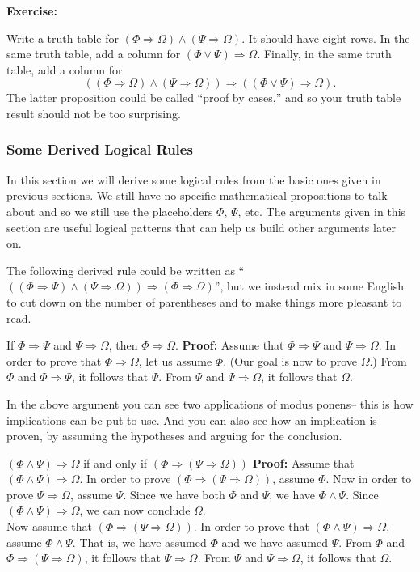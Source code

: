 \documentclass[12pt]{article}
\newcommand{\AND}{\wedge}
\newcommand{\OR}{\vee}
\newcommand{\ARR}{\Rightarrow}
\newcommand{\ex}[1]{\textbf{Exercise:}\begin{adjustwidth}{2em}{}#1\end{adjustwidth}}
\newcommand{\DRULEPF}[3]{\begin{tcolorbox}[title=Derived Rule: #1,colbacktitle=white,coltitle=black,colback=white] {#2} \tcblower \textbf{Proof:} {#3} \end{tcolorbox}}
\def\pA{\Phi}
\def\pB{\Psi}
\def\pC{\Omega}
\begin{document}
\ex{
Write a truth table for $(\pA\ARR\pC)\AND(\pB\ARR\pC)$. It should have eight rows.
In the same truth table, add a column for $(\pA\OR\pB)\ARR\pC$.
Finally, in the same truth table, add a column for 
$$((\pA\ARR\pC)\AND(\pB\ARR\pC))\ARR((\pA\OR\pB)\ARR\pC).$$
The latter proposition could be called ``proof by cases,'' and so your truth table result should not be too surprising.
}

\subsubsection{Some Derived Logical Rules}

In this section we will derive some logical rules from the basic ones given in previous sections.
We still have no specific mathematical propositions to talk about and so we still use the placeholders $\pA$, $\pB$, etc.
The arguments given in this section are useful logical patterns that can help us build other arguments later on.

The following derived rule could be written as ``$((\pA\ARR\pB)\AND(\pB\ARR\pC))\ARR(\pA\ARR\pC)$'',
but we instead mix in some English to cut down on the number of parentheses and to make things more pleasant to read.

\DRULEPF{Transitivity of Implication}{
If $\pA\ARR\pB$ and $\pB\ARR\pC$, then $\pA\ARR\pC$.
}{
Assume that $\pA\ARR\pB$ and $\pB\ARR\pC$.
In order to prove that $\pA\ARR\pC$, let us assume $\pA$.
(Our goal is now to prove $\pC$.)
From $\pA$ and $\pA\ARR\pB$, it follows that $\pB$.
From $\pB$ and $\pB\ARR\pC$, it follows that $\pC$.
}

In the above argument you can see two applications of modus ponens-- this is how implications can be put to use.
And you can also see how an implication is proven, by assuming the hypotheses and arguing for the conclusion.

\def\lsp{\\}

\DRULEPF{Conjunction and Implication}{
$(\pA\AND\pB)\ARR\pC$ if and only if $(\pA\ARR(\pB\ARR\pC))$
}{
Assume that $(\pA\AND\pB)\ARR\pC$.
In order to prove $(\pA\ARR(\pB\ARR\pC))$, assume $\pA$.
Now in order to prove $\pB\ARR\pC$, assume $\pB$.
Since we have both $\pA$ and $\pB$, we have $\pA\AND\pB$.
Since $(\pA\AND\pB)\ARR\pC$, we can now conclude $\pC$.\lsp

Now assume that $(\pA\ARR(\pB\ARR\pC))$.
In order to prove that $(\pA\AND\pB)\ARR\pC$,
assume $\pA\AND\pB$.
That is, we have assumed $\pA$ and we have assumed $\pB$.
From $\pA$ and $\pA\ARR(\pB\ARR\pC)$, it follows that $\pB\ARR\pC$.
From $\pB$ and $\pB\ARR\pC$, it follows that $\pC$.
}
\end{document}
